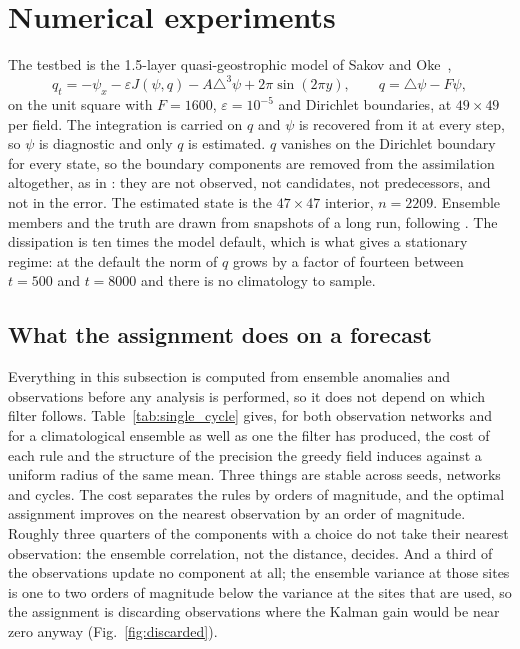 \documentclass[11pt,a4paper]{article}
\begin{document}
\section{Numerical experiments}

The testbed is the 1.5-layer quasi-geostrophic model of Sakov and
Oke~\cite{sakov2008},
%
\begin{equation}
  q_t = -\psi_x - \varepsilon J(\psi,q) - A\triangle^{3}\psi + 2\pi\sin(2\pi y),
  \qquad q = \triangle\psi - F\psi,
\end{equation}
%
on the unit square with $F = 1600$, $\varepsilon = 10^{-5}$ and Dirichlet
boundaries, at $49 \times 49$ per field. The integration is carried on $q$ and
$\psi$ is recovered from it at every step, so $\psi$ is diagnostic and only $q$
is estimated. $q$ vanishes on the Dirichlet boundary for every state, so the
boundary components are removed from the assimilation altogether, as in
\cite{sakov2008}: they are not observed, not candidates, not predecessors,
and not in the error. The estimated state is the $47 \times 47$ interior,
$n = 2209$. Ensemble members and the truth are drawn from
snapshots of a long run, following \cite{sakov2008}. The dissipation is ten
times the model default, which is what gives a stationary regime: at the
default the norm of $q$ grows by a factor of fourteen between $t=500$ and
$t=8000$ and there is no climatology to sample.

\subsection{What the assignment does on a forecast}

Everything in this subsection is computed from ensemble anomalies and
observations before any analysis is performed, so it does not depend on
which filter follows. Table~\ref{tab:single_cycle} gives, for both
observation networks and for a climatological ensemble as well as one the
filter has produced, the cost of each rule and the structure of the
precision the greedy field induces against a uniform radius of the same
mean. Three things are stable across seeds, networks and cycles. The cost
separates the rules by orders of magnitude, and the optimal assignment
improves on the nearest observation by an order of magnitude. Roughly three
quarters of the components with a choice do not take their nearest
observation: the ensemble correlation, not the distance, decides. And a
third of the observations update no component at all; the ensemble variance
at those sites is one to two orders of magnitude below the variance at the
sites that are used, so the assignment is discarding observations where the
Kalman gain would be near zero anyway (Fig.~\ref{fig:discarded}).
\end{document}
